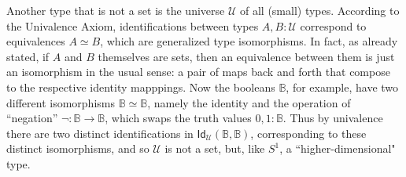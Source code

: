 \documentclass[11pt]{article}
\newcommand{\B}{\ensuremath{\mathbb{B}}}
\newcommand{\Id}{\mathsf{Id}}
\newcommand{\id}[1]{\Id_{#1}}
\newcommand{\U}{\ensuremath{\mathcal{U}}}
\theoremstyle{remark}
\theoremstyle{definition}
\begin{document}
 Another type that is not a set is the universe $\U$ of all (small) types.  According to the Univalence Axiom, identifications between types $A,B:\U$ correspond to equivalences $A\simeq B$, which are generalized type isomorphisms.  In fact, as already stated, if $A$ and $B$ themselves are sets, then an equivalence between them is just an isomorphism in the usual sense: a pair of maps back and forth that compose to the respective identity mapppings.  Now the booleans $\B$, for example, have two different isomorphisms $\B\simeq \B$, namely the identity and the operation of ``negation'' $\neg:\B\to\B$, which swaps the truth values $0,1:\B$.  Thus by univalence there are two distinct identifications in $\id{\U}(\B,\B)$, corresponding to these distinct isomorphisms, and so $\U$ is not a set, but, like $S^1$, a ``higher-dimensional" type.  
 
\end{document}
